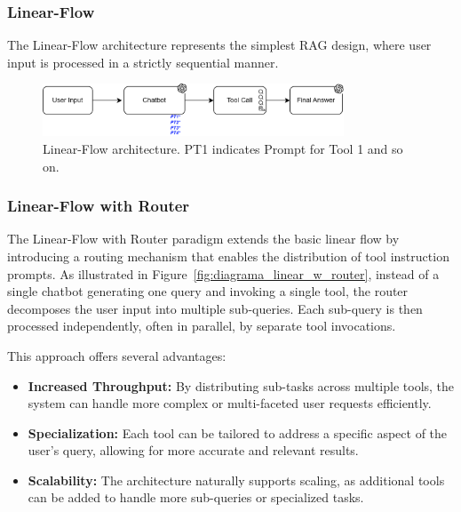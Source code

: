             \subsubsection{Linear-Flow}

                The Linear-Flow architecture represents the simplest RAG design, where user input is processed in a strictly sequential manner. 

                \begin{figure}[h]
                    \centering
                    \includegraphics[width=0.8\textwidth]{images_exp2/diagrama_linear_flow.png}
                    \caption{Linear-Flow architecture. PT1 indicates Prompt for Tool 1 and so on.}
                    \label{fig:diagrama_linear_flow}
                \end{figure}
           

            \subsubsection{Linear-Flow with Router}

                The Linear-Flow with Router paradigm extends the basic linear flow by introducing a routing mechanism that enables the distribution of tool instruction prompts. As illustrated in Figure~\ref{fig:diagrama_linear_w_router}, instead of a single chatbot generating one query and invoking a single tool, the router decomposes the user input into multiple sub-queries. Each sub-query is then processed independently, often in parallel, by separate tool invocations.
                    
                This approach offers several advantages:
                \begin{itemize}
                    \item \textbf{Increased Throughput:} By distributing sub-tasks across multiple tools, the system can handle more complex or multi-faceted user requests efficiently.
                    \item \textbf{Specialization:} Each tool can be tailored to address a specific aspect of the user's query, allowing for more accurate and relevant results.
                    \item \textbf{Scalability:} The architecture naturally supports scaling, as additional tools can be added to handle more sub-queries or specialized tasks.
                \end{itemize}
                
